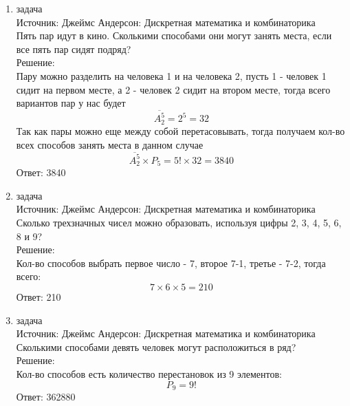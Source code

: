 \documentclass[a4paper,14pt]{extreport} %
\begin{document}
\begin{center}
\begin{enumerate}
						  \item {\large задача  }\\
						 Источник: Джеймс Андерсон: Дискретная математика и комбинаторика\\
						 \vspace{15pt}
						 Пять пар идут в кино. Сколькими способами они могут занять места, если все пять пар сидят подряд?
						 \\
						 \vspace{15pt}
						 Решение:\\
						 Пару можно разделить на человека 1 и на человека 2, пусть 1 - человек 1 сидит на первом месте, а 2 - человек 2 сидит на втором месте, тогда всего вариантов пар у нас будет
						 \begin{equation}\overline{A_2^5} = 2^5=32\end{equation}
						 Так как пары можно еще между собой перетасовывать, тогда получаем кол-во всех способов занять места в данном случае
						 \begin{equation}\overline{A_2^5} \times P_5 = 5!\times 32 = 3840\end{equation}
						 Ответ: 3840
						 
						 
						  \item {\large задача  }\\
						 Источник: Джеймс Андерсон: Дискретная математика и комбинаторика\\
						 \vspace{15pt}
						 Сколько трехзначных чисел можно образовать, используя цифры 2, 3, 4, 5, 6, 8 и 9?
						 \\
						 \vspace{15pt}
						 Решение:\\
						 Кол-во способов выбрать первое число - 7, второе 7-1, третье - 7-2, тогда
						 всего:
						 \begin{equation}7\times 6 \times 5 = 210\end{equation}
						 Ответ: 210
						 
						 \item {\large задача  }\\
						 Источник: Джеймс Андерсон: Дискретная математика и комбинаторика\\
						 \vspace{15pt}
						 Сколькими способами девять человек могут расположиться в ряд?
						 \\
						 \vspace{15pt}
						 Решение:\\
						 Кол-во способов есть количество перестановок из 9 элементов:
						 \begin{equation}P_9 = 9!\end{equation}
						 Ответ: 362880
						 

\end{enumerate}
\end{center}
\end{document}

